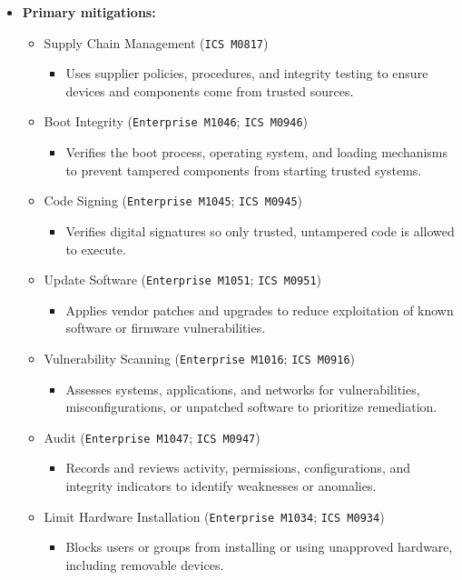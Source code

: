 \documentclass[10pt,a4paper,oneside]{report}
\begin{document}
\begin{itemize}
\item \textbf{Primary mitigations:}
\begin{itemize}
\item Supply Chain Management (\texttt{ICS M0817})
\begin{itemize}
\item Uses supplier policies, procedures, and integrity testing to ensure devices and components come from trusted sources.
\end{itemize}
\item Boot Integrity (\texttt{Enterprise M1046}; \texttt{ICS M0946})
\begin{itemize}
\item Verifies the boot process, operating system, and loading mechanisms to prevent tampered components from starting trusted systems.
\end{itemize}
\item Code Signing (\texttt{Enterprise M1045}; \texttt{ICS M0945})
\begin{itemize}
\item Verifies digital signatures so only trusted, untampered code is allowed to execute.
\end{itemize}
\item Update Software (\texttt{Enterprise M1051}; \texttt{ICS M0951})
\begin{itemize}
\item Applies vendor patches and upgrades to reduce exploitation of known software or firmware vulnerabilities.
\end{itemize}
\item Vulnerability Scanning (\texttt{Enterprise M1016}; \texttt{ICS M0916})
\begin{itemize}
\item Assesses systems, applications, and networks for vulnerabilities, misconfigurations, or unpatched software to prioritize remediation.
\end{itemize}
\item Audit (\texttt{Enterprise M1047}; \texttt{ICS M0947})
\begin{itemize}
\item Records and reviews activity, permissions, configurations, and integrity indicators to identify weaknesses or anomalies.
\end{itemize}
\item Limit Hardware Installation (\texttt{Enterprise M1034}; \texttt{ICS M0934})
\begin{itemize}
\item Blocks users or groups from installing or using unapproved hardware, including removable devices.
\end{itemize}
\end{itemize}
\end{itemize}
\end{document}
